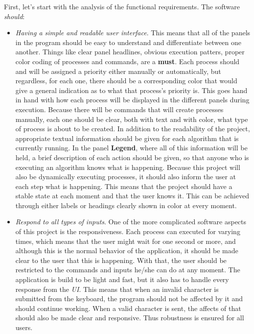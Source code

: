 \documentclass{article}
\begin{document}
First, let's start with the analysis of the functional requirements. The software \textit{should}:

\begin{itemize}
\item \textit{Having a simple and readable user interface}. This means that all of the panels in the program should be easy to understand and differentiate between one another. Things like clear panel headlines, obvious execution patters, proper color coding of processes and commands, are a \textbf{must}. Each process should and will be assigned a priority either manually or automatically, but regardless, for each one, there should be a corresponding color that would give a general indication as to what that process's priority is. This goes hand in hand with how each process will be displayed in the different panels during execution. Because there will be commands that will create processes manually, each one should be clear, both with text and with color, what type of process is about to be created. In addition to the readability of the project, appropriate textual information should be given for each algorithm that is currently running. In the panel \textbf{Legend}, where all of this information will be held, a brief description of each action should be given, so that anyone who is executing an algorithm knows what is happening. Because this project will also be dynamically executing processes, it should also inform the user at each step what is happening. This means that the project should have a stable state at each moment and that the user knows it. This can be achieved through either labels or headings clearly shown in color at every moment.

\item \textit{Respond to all types of inputs}. One of the more complicated software aspects of this project is the responsiveness. Each process can executed for varying times, which means that the user might wait for one second or more, and although this is the normal behavior of the application, it should be made clear to the user that this is happening. With that, the user should be restricted to the commands and inputs he/she can do at any moment. The application is build to be light and fast, but it also has to handle every response from the \textit{UI}. This means that when an invalid character is submitted from the keyboard, the program should not be affected by it and should continue working. When a valid character is sent, the affects of that should also be made clear and responsive. Thus robustness is ensured for all users.


\end{itemize}
\end{document}
